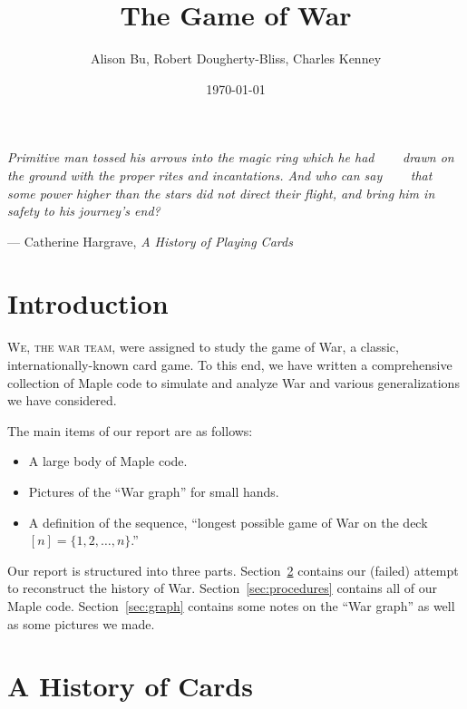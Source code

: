 \documentclass[12pt]{amsart}
\title{The Game of War}
\author{Alison Bu, Robert Dougherty-Bliss, Charles Kenney}
\date{\today}
\begin{document}
\maketitle


\epigraph{\emph{Primitive man tossed his arrows into the magic ring which he had
    drawn on the ground with the proper rites and incantations. And who can say
    that some power higher than the stars did not direct their flight, and
bring him in safety to his journey's end?}}{--- Catherine Hargrave, \emph{A History of Playing Cards}}

\section{Introduction}%
\label{sec:introduction}

\lettrine[lraise=0.16]{W}{e, the war team,} were assigned to study the game of
War, a classic, internationally-known card game. To this end, we have written a
comprehensive collection of Maple code to simulate and analyze War and various
generalizations we have considered.

The main items of our report are as follows:

\begin{itemize}
    \item A large body of Maple code.
    \item Pictures of the ``War graph'' for small hands.
    \item A definition of the sequence, ``longest possible game of War on the
        deck $[n] = \{1, 2, \dots, n\}$.''
\end{itemize}

Our report is structured into three parts. Section~\ref{sec:history} contains
our (failed) attempt to reconstruct the history of War\footnotemark.
Section~\ref{sec:procedures} contains all of our Maple code.
Section~\ref{sec:graph} contains some notes on the ``War graph'' as well as
some pictures we made.


\section{A History of Cards}
\label{sec:history}



\end{document}
